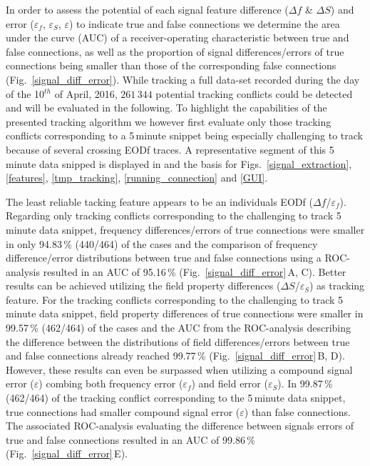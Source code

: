 \documentclass[11pt,pdftex]{article}
\newcommand{\panel}[1]{\textsf{#1}}
\newcommand{\fref}[1]{\textup{\ref{#1}}}
\newcommand{\subfref}[2]{\textup{\ref{#1}}\,\panel{#2}}
\newcommand{\fig}{Fig.}
\newcommand{\figs}{Figs.}
\newcommand{\figref}[1]{\fig~\fref{#1}}
\newcommand{\figsref}[1]{\figs~\fref{#1}}
\newcommand{\subfigref}[2]{\fig~\subfref{#1}{#2}}
\begin{document}
In order to assess the potential of each signal feature difference ($\Delta f$ \& $\Delta S$) and error ($\varepsilon_f$, $\varepsilon_S$, $\varepsilon$) to indicate true and false connections we determine the area under the curve (AUC) of a receiver-operating characteristic between true and false connections, as well as the proportion of signal differences/errors of true connections being smaller than those of the corresponding false connections (\figref{signal_diff_error}). While tracking a full data-set recorded during the day of the 10$^{th}$ of April, 2016, $261\,344$ potential tracking conflicts could be detected and will be evaluated in the following. To highlight the capabilities of the presented tracking algorithm we however first evaluate only those tracking conflicts corresponding to a 5\,minute snippet being especially challenging to track because of several crossing EODf traces. A representative segment of this 5\,minute data snipped is displayed in and the basis for \figsref{signal_extraction}, \fref{features}, \fref{tmp_tracking}, \fref{running_connection} and \fref{GUI}.

The least reliable tacking feature appears to be an individuals EODf ($\Delta f$/$\varepsilon_f$). Regarding only tracking conflicts corresponding to the challenging to track 5\,minute data snippet, frequency differences/errors of true connections were smaller in only 94.83\,\% (440/464) of the cases and the comparison of frequency difference/error distributions between true and false connections using a ROC-analysis resulted in an AUC of 95.16\,\% (\subfigref{signal_diff_error}{A, C}). Better results can be achieved utilizing the field property differences ($\Delta S$/$\varepsilon_S$) as tracking feature. For the tracking conflicts corresponding to the challenging to track 5\,minute data snippet, field property differences of true connections were smaller in 99.57\,\% (462/464) of the cases and the AUC from the ROC-analysis describing the difference between the distributions of field differences/errors between true and false connections already reached 99.77\,\% (\subfigref{signal_diff_error}{B, D}). However, these results can even be surpassed when utilizing a compound signal error ($\varepsilon$) combing both frequency error ($\varepsilon_f$) and field error ($\varepsilon_S$). In 99.87\,\% (462/464) of the tracking conflict corresponding to the 5\,minute data snippet, true connections had smaller compound signal error ($\varepsilon$) than false connections. The associated ROC-analysis evaluating the difference between signals errors of true and false connections resulted in an AUC of 99.86\,\% (\subfigref{signal_diff_error}{E}). 
\end{document}

